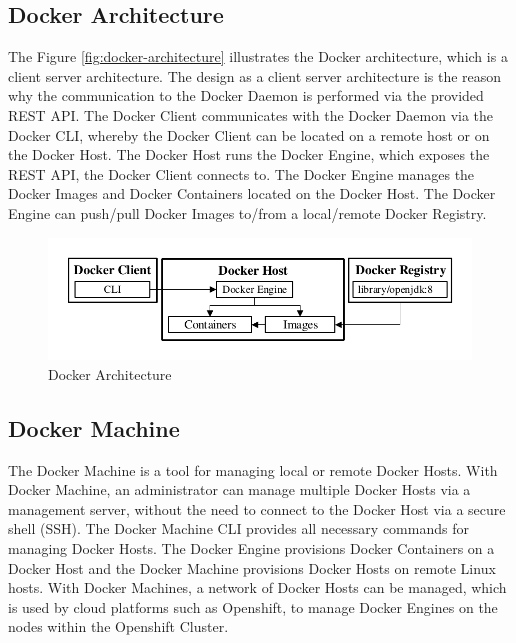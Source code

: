 \subsection{Docker Architecture}
\label{sec:docker-architecture}
The Figure \vref{fig:docker-architecture} illustrates the Docker architecture, which is a client server architecture. The design as a client server architecture is the reason why the communication to the Docker Daemon is performed via the provided REST API. The Docker Client communicates with the Docker Daemon via the Docker CLI, whereby the Docker Client can be located on a remote host or on the Docker Host. The Docker Host runs the Docker Engine, which exposes the REST API, the Docker Client connects to. The Docker Engine manages the Docker Images and Docker Containers located on the Docker Host. The Docker Engine can push/pull Docker Images to/from a local/remote Docker Registry.

\begin{figure}[htbp]
	\centering
	\includegraphics[scale=1]{images/docker-architecture.pdf}
	\caption{Docker Architecture}
	\label{fig:docker-architecture}
\end{figure} 

\subsection{Docker Machine}
\label{sec:docker-machine}
The Docker Machine is a tool for managing local or remote Docker Hosts. With Docker Machine, an administrator can manage multiple Docker Hosts via a management server, without the need to connect to the Docker Host via a secure shell (SSH). The Docker Machine CLI provides all necessary commands for managing Docker Hosts. The Docker Engine provisions Docker Containers on a Docker Host and the Docker Machine provisions Docker Hosts on remote Linux hosts. With Docker Machines, a network of Docker Hosts can be managed, which is used by cloud platforms such as Openshift, to manage Docker Engines on the nodes within the Openshift Cluster\cite{DockerMachine2018}.  


